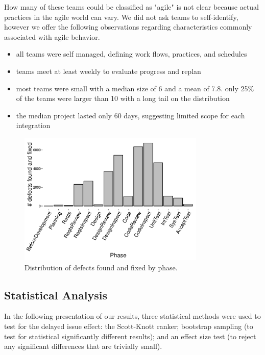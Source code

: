 \documentclass[smallcondensed]{svjour3}
\begin{document}
How many of these teams could be classified as "agile" is not clear because actual practices in the agile world can vary. We did not ask teams to self-identify, however we offer the following observations regarding characteristics commonly associated with agile behavior. 
\begin{itemize}
    \item all teams were self managed, defining work flows, practices, and schedules
    \item teams meet at least weekly to evaluate progress and replan
    \item most teams were small with a median size of 6 and a mean of 7.8. only 25\% of the teams were larger than 10 with a long tail on the distribution
    \item the median project lasted only 60 days, suggesting limited scope for each integration
\end{itemize}
  


\begin{figure}[!t] 
\vspace{0.5cm}
\begin{center}
\includegraphics[height=2.5in]{img/fix-phase-dist.pdf}
\end{center} 
\caption{Distribution of defects found and fixed by phase.}
\label{fig:fix-phase-dist}
\end{figure}





\subsection{Statistical Analysis}\label{sect:stats}
    
    In the following presentation of our results, three statistical methods were used to test for the delayed
    issue effect: the Scott-Knott ranker;   bootstrap sampling (to test for statistical significantly
    different results); and an effect size test (to reject any significant differences that are trivially small).
    
\end{document}
